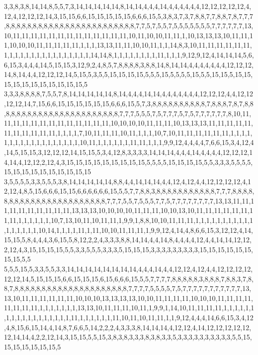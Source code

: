 3,3,8,3,8,14,14,8,5,5,7,3,14,14,14,14,14,8,14,14,4,4,4,14,4,4,4,4,4,4,12,12,12,12,12,4,12,4,12,12,12,14,3,15,15,6,6,15,15,15,15,15,6,6,6,15,5,3,8,3,7,3,7,8,8,7,7,8,8,7,8,7,7,7,8,8,8,8,8,8,8,8,8,8,8,8,8,8,8,8,8,8,8,8,8,8,8,8,7,7,5,7,5,5,7,5,5,5,5,5,5,5,7,7,7,7,7,7,13,10,11,11,11,11,11,11,11,11,11,11,11,11,11,10,11,10,10,11,11,1,10,13,13,13,10,11,11,11,10,10,10,11,11,11,11,11,1,1,1,13,13,11,11,10,10,11,1,1,14,8,3,10,11,11,11,11,11,11,1,1,1,1,1,1,1,1,1,1,1,1,1,1,1,1,14,14,8,1,1,1,1,1,1,1,1,11,1,1,1,9,12,9,12,4,14,14,14,5,6,6,15,3,4,4,4,14,5,15,15,3,12,9,2,4,8,5,7,8,8,8,8,3,8,8,14,8,14,14,4,4,4,4,4,4,4,12,12,12,14,8,14,4,4,12,12,12,14,5,15,5,3,5,5,15,15,15,15,5,5,5,15,5,5,5,5,15,5,5,15,15,5,15,15,15,15,15,15,15,15,15,15,15,5
3,3,3,8,8,8,8,7,5,5,7,8,14,14,14,14,14,8,14,4,4,4,14,14,4,4,4,4,4,4,4,12,12,12,4,4,12,12,12,12,14,7,15,6,6,15,15,15,15,15,15,6,6,6,15,5,7,3,8,8,8,8,8,8,8,8,8,8,7,8,8,8,7,8,7,8,8,8,8,8,8,8,8,8,8,8,8,8,8,8,8,8,8,8,8,8,8,8,7,7,7,5,5,5,7,5,7,7,7,5,7,5,7,7,7,7,7,7,8,10,11,11,11,11,11,11,11,11,11,11,11,11,11,10,10,10,10,11,11,11,10,13,13,13,11,11,11,11,11,11,11,11,11,11,11,1,1,1,1,7,10,11,11,11,10,11,1,1,1,10,7,10,11,11,11,11,11,11,1,1,1,1,1,1,1,1,1,1,1,1,1,1,1,1,1,1,10,11,1,1,1,1,1,1,11,11,1,1,1,9,9,12,4,4,4,4,7,6,6,15,3,4,12,4,14,5,15,15,3,12,12,12,14,15,15,5,3,4,12,8,3,3,3,3,14,14,14,4,4,4,14,4,4,4,4,12,12,12,14,14,4,12,12,2,12,4,3,15,15,15,15,15,15,15,15,15,5,5,5,5,15,15,15,15,5,5,3,3,3,5,5,5,5,15,15,15,15,15,15,15,15,15,15
3,5,5,5,5,3,3,5,5,5,3,8,14,14,14,14,14,8,8,4,4,14,14,14,4,4,12,4,12,4,4,12,12,12,12,4,12,12,4,8,5,15,6,6,6,15,15,6,6,6,6,6,6,15,5,5,7,7,8,8,3,8,8,8,8,8,8,8,8,8,8,8,7,7,7,8,8,8,8,8,8,8,8,8,8,8,8,8,8,8,8,8,8,8,8,8,8,8,7,7,7,5,5,7,5,5,5,7,7,5,7,7,7,7,7,7,7,7,13,13,11,11,11,11,11,11,11,11,11,11,13,13,13,10,10,10,10,11,11,11,10,10,13,10,11,11,11,11,11,11,11,11,1,1,1,1,1,1,10,7,13,10,11,10,11,11,1,9,9,1,8,8,10,10,11,11,11,1,1,1,1,1,1,1,1,1,1,1,1,1,1,1,1,1,10,14,1,1,1,1,11,1,11,10,10,11,11,11,1,9,9,12,4,14,4,8,6,6,15,3,12,12,4,14,15,15,5,8,4,4,4,3,6,15,5,8,12,2,2,4,3,3,3,8,8,14,14,4,4,14,8,4,4,4,4,12,4,4,14,14,12,12,2,12,4,3,15,15,15,15,5,5,3,3,5,5,5,3,3,3,5,15,15,15,3,3,3,3,3,3,3,3,3,15,15,15,15,15,15,15,15,5,5
5,5,5,15,5,3,3,5,5,3,3,14,14,14,14,14,14,14,14,4,4,4,14,4,4,12,12,4,12,4,4,12,12,12,12,12,12,14,5,15,15,15,6,6,15,15,15,6,15,6,6,6,15,5,5,7,7,7,7,8,8,8,8,8,3,8,8,8,7,8,8,3,7,8,8,7,8,8,8,8,8,8,8,8,8,8,8,8,8,8,8,8,8,8,8,8,8,7,7,7,7,5,5,5,5,7,5,7,7,7,7,7,7,7,7,7,7,7,13,13,10,11,11,11,11,11,11,10,10,10,13,13,13,13,10,10,11,11,11,11,10,10,10,11,11,11,11,11,11,11,11,1,1,1,1,1,1,1,13,13,10,11,11,11,10,11,1,9,9,1,14,10,11,11,11,11,1,1,1,1,1,1,1,1,1,1,1,1,1,1,1,1,1,1,11,1,1,1,1,1,1,11,10,11,10,11,11,1,1,9,12,4,4,4,14,6,6,15,3,4,12,4,8,15,6,15,14,4,14,8,7,6,6,5,14,2,2,2,4,3,3,3,8,14,14,14,4,12,12,4,14,12,12,12,12,12,12,14,14,4,2,2,12,14,3,15,15,5,5,15,3,8,3,8,3,3,3,8,3,8,3,3,5,3,3,3,3,3,3,3,3,3,3,5,5,15,15,15,15,15,15,15,5
